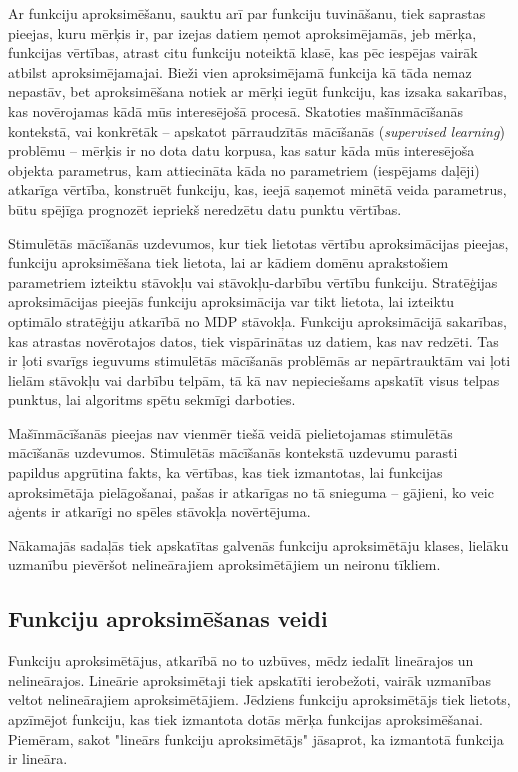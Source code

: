\documentclass{ludis} %
\begin{document}
Ar funkciju aproksimēšanu, sauktu arī par funkciju tuvināšanu, tiek saprastas
pieejas, kuru mērķis ir, par izejas datiem ņemot aproksimējamās, jeb mērķa,
funkcijas vērtības, atrast citu funkciju noteiktā klasē, kas pēc iespējas vairāk
atbilst aproksimējamajai. Bieži vien aproksimējamā funkcija kā tāda nemaz
nepastāv, bet aproksimēšana notiek ar mērķi iegūt funkciju, kas izsaka
sakarības, kas novērojamas kādā mūs interesējošā procesā. Skatoties
mašīnmācīšanās kontekstā, vai konkrētāk -- apskatot pārraudzītās mācīšanās
(\textit{supervised learning}) problēmu -- mērķis ir no dota datu korpusa, kas
satur kāda mūs interesējoša objekta parametrus, kam attiecināta kāda no
parametriem (iespējams daļēji) atkarīga vērtība, konstruēt funkciju, kas, ieejā
saņemot minētā veida parametrus, būtu spējīga prognozēt iepriekš neredzētu datu
punktu vērtības.

Stimulētās mācīšanās uzdevumos, kur tiek lietotas vērtību aproksimācijas
pieejas, funkciju aproksimēšana tiek lietota, lai ar kādiem domēnu aprakstošiem
parametriem izteiktu stāvokļu vai stāvokļu-darbību vērtību funkciju. Stratēģijas
aproksimācijas pieejās funkciju aproksimācija var tikt lietota, lai izteiktu
optimālo stratēģiju atkarībā no MDP stāvokļa. Funkciju aproksimācijā sakarības,
kas atrastas novērotajos datos, tiek vispārinātas uz datiem, kas nav redzēti.
Tas ir ļoti svarīgs ieguvums stimulētās mācīšanās problēmās ar nepārtrauktām vai
ļoti lielām stāvokļu vai darbību telpām, tā kā nav nepieciešams apskatīt visus
telpas punktus, lai algoritms spētu sekmīgi darboties.

Mašīnmācīšanās pieejas nav vienmēr tiešā veidā pielietojamas stimulētās
mācīšanās uzdevumos. Stimulētās mācīšanās kontekstā uzdevumu parasti papildus
apgrūtina fakts, ka vērtības, kas tiek izmantotas, lai funkcijas aproksimētāja
pielāgošanai, pašas ir atkarīgas no tā snieguma -- gājieni, ko veic aģents ir
atkarīgi no spēles stāvokļa novērtējuma.

Nākamajās sadaļās tiek apskatītas galvenās funkciju aproksimētāju klases,
lielāku uzmanību pievēršot nelineārajiem aproksimētājiem un neironu tīkliem.

\subsection{Funkciju aproksimēšanas veidi}
Funkciju aproksimētājus, atkarībā no to uzbūves, mēdz iedalīt lineārajos un
nelineārajos. Lineārie aproksimētaji tiek apskatīti ierobežoti, vairāk uzmanības
veltot nelineārajiem aproksimētājiem. Jēdziens funkciju aproksimētājs tiek
lietots, apzīmējot funkciju, kas tiek izmantota dotās mērķa funkcijas
aproksimēšanai. Piemēram, sakot "lineārs funkciju aproksimētājs" jāsaprot, ka
izmantotā funkcija ir lineāra.
\end{document}
